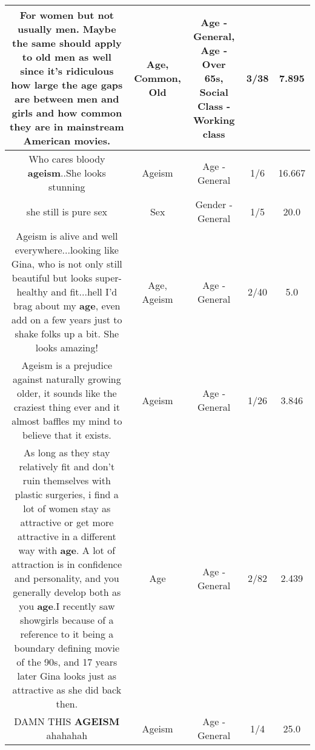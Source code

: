 \documentclass[11pt]{article}
\newlength\mylength
\begin{document}
\begin{center}
\begin{longtable}{|C{.65\mylength}|C{.30\mylength}|C{.12\mylength}|C{.12\mylength}|C{.12\mylength}|}
  \small For women but not usually men.  Maybe the same should apply to \textbf{old} men as well since it's ridiculous how large the \textbf{age} gaps are between men and girls and how \textbf{common} they are in mainstream American movies.\normalsize   & Age, Common, Old & Age - General, Age - Over 65s, Social Class - Working class & 3/38 & 7.895 \\  \hline
  \small Who cares bloody \textbf{ageism}..She looks stunning\normalsize   & Ageism & Age - General & 1/6 & 16.667 \\  \hline
  \small she still is pure sex\normalsize   & Sex & Gender - General & 1/5 & 20.0 \\  \hline
  \small Ageism is alive and well everywhere...looking like Gina, who is not only still beautiful but looks super-healthy and fit...hell I'd brag about my \textbf{age}, even add on a few years just to shake folks up a bit.  She looks amazing!\normalsize   & Age, Ageism & Age - General & 2/40 & 5.0 \\  \hline
  \small Ageism is a prejudice against naturally growing older, it sounds like the craziest thing ever and it almost baffles my mind to believe that it exists.\normalsize   & Ageism & Age - General & 1/26 & 3.846 \\  \hline
  \small As long as they stay relatively fit and don't ruin themselves with plastic surgeries, i find a lot of women stay as attractive or get more attractive in a different way with \textbf{age}. A lot of attraction is in confidence and personality, and you generally develop both as you \textbf{age}.I recently saw showgirls because of a reference to it being a boundary defining movie of the 90s, and 17 years later Gina looks just as attractive as she did back then.\normalsize   & Age & Age - General & 2/82 & 2.439 \\  \hline
  \small DAMN THIS \textbf{AGEISM} ahahahah\normalsize   & Ageism & Age - General & 1/4 & 25.0 \\  \hline

\end{longtable}
\end{center}
\end{document}
